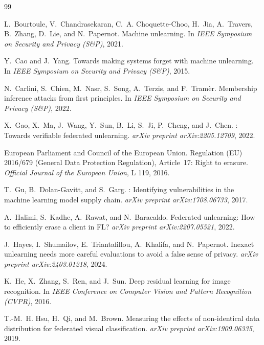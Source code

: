 \documentclass[11pt]{article}
\begin{document}
\begin{thebibliography}{99}
\small

L.~Bourtoule, V.~Chandrasekaran, C.~A. Choquette-Choo, H.~Jia, A.~Travers,
B.~Zhang, D.~Lie, and N.~Papernot.
\newblock Machine unlearning.
\newblock In \emph{IEEE Symposium on Security and Privacy (S\&P)}, 2021.

Y.~Cao and J.~Yang.
\newblock Towards making systems forget with machine unlearning.
\newblock In \emph{IEEE Symposium on Security and Privacy (S\&P)}, 2015.

N.~Carlini, S.~Chien, M.~Nasr, S.~Song, A.~Terzis, and F.~Tram\`er.
\newblock Membership inference attacks from first principles.
\newblock In \emph{IEEE Symposium on Security and Privacy (S\&P)}, 2022.

X.~Gao, X.~Ma, J.~Wang, Y.~Sun, B.~Li, S.~Ji, P.~Cheng, and J.~Chen.
: Towards verifiable federated unlearning.
\newblock \emph{arXiv preprint arXiv:2205.12709}, 2022.

European Parliament and Council of the European Union.
\newblock Regulation ({EU}) 2016/679 (General Data Protection Regulation),
Article~17: Right to erasure.
\newblock \emph{Official Journal of the European Union}, L 119, 2016.

T.~Gu, B.~Dolan-Gavitt, and S.~Garg.
: Identifying vulnerabilities in the machine learning model
supply chain.
\newblock \emph{arXiv preprint arXiv:1708.06733}, 2017.

A.~Halimi, S.~Kadhe, A.~Rawat, and N.~Baracaldo.
\newblock Federated unlearning: How to efficiently erase a client in {FL}?
\newblock \emph{arXiv preprint arXiv:2207.05521}, 2022.

J.~Hayes, I.~Shumailov, E.~Triantafillou, A.~Khalifa, and N.~Papernot.
\newblock Inexact unlearning needs more careful evaluations to avoid a false
sense of privacy.
\newblock \emph{arXiv preprint arXiv:2403.01218}, 2024.

K.~He, X.~Zhang, S.~Ren, and J.~Sun.
\newblock Deep residual learning for image recognition.
\newblock In \emph{IEEE Conference on Computer Vision and Pattern Recognition
(CVPR)}, 2016.

T.-M.~H. Hsu, H.~Qi, and M.~Brown.
\newblock Measuring the effects of non-identical data distribution for
federated visual classification.
\newblock \emph{arXiv preprint arXiv:1909.06335}, 2019.


\end{thebibliography}
\end{document}
